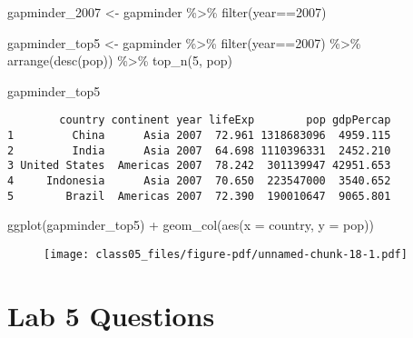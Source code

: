 \documentclass[
  letterpaper,
  DIV=11,
  numbers=noendperiod]{scrartcl}
\newenvironment{Shaded}{\begin{snugshade}}{\end{snugshade}}
\newcommand{\AttributeTok}[1]{\textcolor[rgb]{0.40,0.45,0.13}{#1}}
\newcommand{\DecValTok}[1]{\textcolor[rgb]{0.68,0.00,0.00}{#1}}
\newcommand{\FunctionTok}[1]{\textcolor[rgb]{0.28,0.35,0.67}{#1}}
\newcommand{\NormalTok}[1]{\textcolor[rgb]{0.00,0.23,0.31}{#1}}
\newcommand{\OtherTok}[1]{\textcolor[rgb]{0.00,0.23,0.31}{#1}}
\newcommand{\SpecialCharTok}[1]{\textcolor[rgb]{0.37,0.37,0.37}{#1}}
\begin{document}
\begin{Shaded}
\begin{Highlighting}[]
\NormalTok{gapminder\_2007 }\OtherTok{\textless{}{-}}\NormalTok{ gapminder }\SpecialCharTok{\%\textgreater{}\%} \FunctionTok{filter}\NormalTok{(year}\SpecialCharTok{==}\DecValTok{2007}\NormalTok{)}
\end{Highlighting}
\end{Shaded}

\begin{Shaded}
\begin{Highlighting}[]
\NormalTok{gapminder\_top5 }\OtherTok{\textless{}{-}}\NormalTok{ gapminder }\SpecialCharTok{\%\textgreater{}\%} 
  \FunctionTok{filter}\NormalTok{(year}\SpecialCharTok{==}\DecValTok{2007}\NormalTok{) }\SpecialCharTok{\%\textgreater{}\%} 
  \FunctionTok{arrange}\NormalTok{(}\FunctionTok{desc}\NormalTok{(pop)) }\SpecialCharTok{\%\textgreater{}\%} 
  \FunctionTok{top\_n}\NormalTok{(}\DecValTok{5}\NormalTok{, pop)}

\NormalTok{gapminder\_top5}
\end{Highlighting}
\end{Shaded}

\begin{verbatim}
        country continent year lifeExp        pop gdpPercap
1         China      Asia 2007  72.961 1318683096  4959.115
2         India      Asia 2007  64.698 1110396331  2452.210
3 United States  Americas 2007  78.242  301139947 42951.653
4     Indonesia      Asia 2007  70.650  223547000  3540.652
5        Brazil  Americas 2007  72.390  190010647  9065.801
\end{verbatim}

\begin{Shaded}
\begin{Highlighting}[]
\FunctionTok{ggplot}\NormalTok{(gapminder\_top5) }\SpecialCharTok{+} 
  \FunctionTok{geom\_col}\NormalTok{(}\FunctionTok{aes}\NormalTok{(}\AttributeTok{x =}\NormalTok{ country, }\AttributeTok{y =}\NormalTok{ pop))}
\end{Highlighting}
\end{Shaded}

\begin{figure}[H]

{\centering \texttt{[image: class05\_files/figure-pdf/unnamed-chunk-18-1.pdf]}

}

\end{figure}

\hypertarget{lab-5-questions}{%
\section{Lab 5 Questions}\label{lab-5-questions}}
\end{document}
